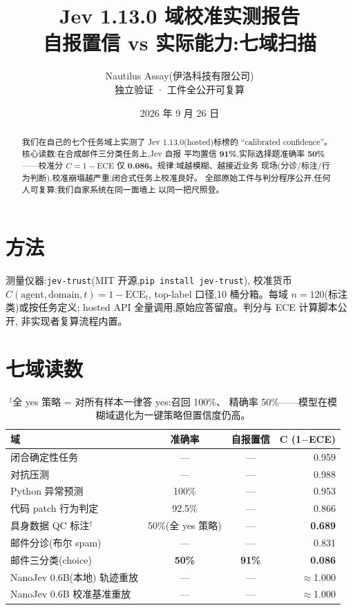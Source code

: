 \documentclass[11pt]{article}
\title{\textbf{Jev 1.13.0 域校准实测报告}\\[4pt]
\large 自报置信 vs 实际能力:七域扫描}
\author{Nautilus Assay(伊洛科技有限公司)\\ \small 独立验证 · 工件全公开可复算}
\date{2026 年 9 月 26 日}
\begin{document}
\maketitle

\begin{abstract}
\noindent 我们在自己的七个任务域上实测了 Jev 1.13.0(hosted)标榜的
``calibrated confidence''。核心读数:在合成邮件三分类任务上,Jev 自报
平均置信 \textbf{91\%},实际选择题准确率 \textbf{50\%}——校准分
$C = 1-\mathrm{ECE}$ 仅 \textbf{0.086}。规律:域越模糊、越接近业务
现场(分诊/标注/行为判断),校准崩塌越严重;闭合式任务上校准良好。
全部原始工件与判分程序公开,任何人可复算;我们自家系统在同一面墙上
以同一把尺照登。
\end{abstract}

\section{方法}
测量仪器:\texttt{jev-trust}(MIT 开源,\texttt{pip install jev-trust}),
校准货币 $C(\text{agent},\text{domain},t) = 1 - \mathrm{ECE}_t$,
top-label 口径,10 桶分箱。每域 $n{=}120$(标注类)或按任务定义;
hosted API 全量调用,原始应答留痕。判分与 ECE 计算脚本公开,
非实现者复算流程内置。

\section{七域读数}

\begin{table}[h]
\centering
\begin{tabular}{lccR}
\toprule
\textbf{域} & \textbf{准确率} & \textbf{自报置信} & \textbf{C (1$-$ECE)} \\
\midrule
闭合确定性任务 & — & — & 0.959 \\
对抗压测 & — & — & 0.988 \\
Python 异常预测 & 100\% & — & 0.953 \\
代码 patch 行为判定 & 92.5\% & — & 0.866 \\
具身数据 QC 标注$^{\dagger}$ & 50\%(全 yes 策略) & — & \textbf{0.689} \\
邮件分诊(布尔 spam) & — & — & 0.831 \\
邮件三分类(choice) & \textbf{50\%} & \textbf{91\%} & \textbf{0.086} \\
\midrule
NanoJev 0.6B(本地) 轨迹重放 & — & — & $\approx$1.000 \\
NanoJev 0.6B 校准基准重放 & — & — & $\approx$1.000 \\
\bottomrule
\end{tabular}
\caption{$^{\dagger}$全 yes 策略 = 对所有样本一律答 yes:召回 100\%、
精确率 50\%——模型在模糊域退化为一键策略但置信度仍高。}
\end{table}
\end{document}
